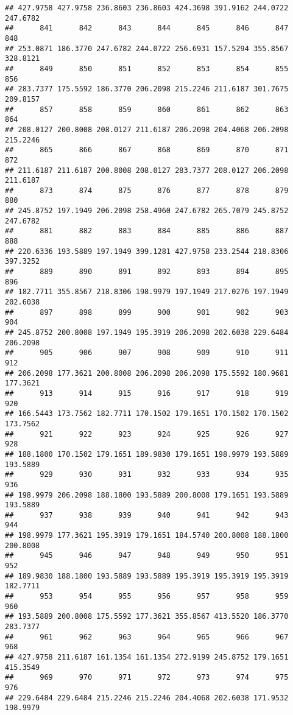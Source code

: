\documentclass[
]{article}
\begin{document}
\begin{verbatim}
## 427.9758 427.9758 236.8603 236.8603 424.3698 391.9162 244.0722 247.6782 
##      841      842      843      844      845      846      847      848 
## 253.0871 186.3770 247.6782 244.0722 256.6931 157.5294 355.8567 328.8121 
##      849      850      851      852      853      854      855      856 
## 283.7377 175.5592 186.3770 206.2098 215.2246 211.6187 301.7675 209.8157 
##      857      858      859      860      861      862      863      864 
## 208.0127 200.8008 208.0127 211.6187 206.2098 204.4068 206.2098 215.2246 
##      865      866      867      868      869      870      871      872 
## 211.6187 211.6187 200.8008 208.0127 283.7377 208.0127 206.2098 211.6187 
##      873      874      875      876      877      878      879      880 
## 245.8752 197.1949 206.2098 258.4960 247.6782 265.7079 245.8752 247.6782 
##      881      882      883      884      885      886      887      888 
## 220.6336 193.5889 197.1949 399.1281 427.9758 233.2544 218.8306 397.3252 
##      889      890      891      892      893      894      895      896 
## 182.7711 355.8567 218.8306 198.9979 197.1949 217.0276 197.1949 202.6038 
##      897      898      899      900      901      902      903      904 
## 245.8752 200.8008 197.1949 195.3919 206.2098 202.6038 229.6484 206.2098 
##      905      906      907      908      909      910      911      912 
## 206.2098 177.3621 200.8008 206.2098 206.2098 175.5592 180.9681 177.3621 
##      913      914      915      916      917      918      919      920 
## 166.5443 173.7562 182.7711 170.1502 179.1651 170.1502 170.1502 173.7562 
##      921      922      923      924      925      926      927      928 
## 188.1800 170.1502 179.1651 189.9830 179.1651 198.9979 193.5889 193.5889 
##      929      930      931      932      933      934      935      936 
## 198.9979 206.2098 188.1800 193.5889 200.8008 179.1651 193.5889 193.5889 
##      937      938      939      940      941      942      943      944 
## 198.9979 177.3621 195.3919 179.1651 184.5740 200.8008 188.1800 200.8008 
##      945      946      947      948      949      950      951      952 
## 189.9830 188.1800 193.5889 193.5889 195.3919 195.3919 195.3919 182.7711 
##      953      954      955      956      957      958      959      960 
## 193.5889 200.8008 175.5592 177.3621 355.8567 413.5520 186.3770 283.7377 
##      961      962      963      964      965      966      967      968 
## 427.9758 211.6187 161.1354 161.1354 272.9199 245.8752 179.1651 415.3549 
##      969      970      971      972      973      974      975      976 
## 229.6484 229.6484 215.2246 215.2246 204.4068 202.6038 171.9532 198.9979 

\end{verbatim}
\end{document}
